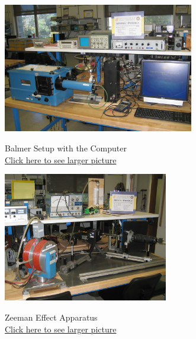 \documentclass{../lab}
\begin{document}
\begin{figure}[H]
\captionsetup{justification=centering}
  \href{http://experimentationlab.berkeley.edu/sites/default/files/images/ATM_Balmer_3490-Crop-Lg.jpg}{\includegraphics[height=160pt,keepaspectratio]{images/ATM_Balmer_3490-Crop-Lg.jpg}}
  \caption{Balmer Setup with the Computer \\ \href{http://experimentationlab.berkeley.edu/sites/default/files/images/ATM_Balmer_3490-Crop-Lg.jpg}{Click here to see larger picture}}
  \label{fig:BalmerApparatus}
\endminipage\hfill
{}
  \href{http://experimentationlab.berkeley.edu/sites/default/files/images/ATM_ZeemanSetup_3492-Crop-Lg.jpg}{\includegraphics[height=160pt,keepaspectratio]{images/ATM_ZeemanSetup_3492-Crop-Lg.jpg}}
  \caption{Zeeman Effect Apparatus \\
  \href{http://experimentationlab.berkeley.edu/sites/default/files/images/ATM_ZeemanSetup_3492-Crop-Lg.jpg}{Click here to see larger picture}}
  \label{fig:ZeemanApparatus}
\endminipage

\end{figure}
\end{document}
